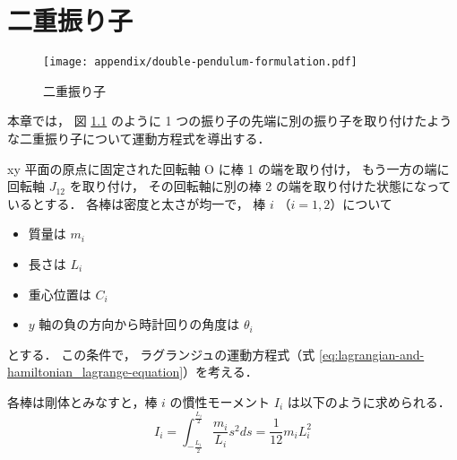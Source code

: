 %

\chapter{二重振り子}\label{chap:double-pendulum}

\begin{figure}[tp]
    \centering
    \texttt{[image: appendix/double-pendulum-formulation.pdf]}
    \caption{二重振り子}
    \label{fig:double-pendulum_double-pendulum-formulation}
\end{figure}

本章では，
図 \ref{fig:double-pendulum_double-pendulum-formulation} のように
1 つの振り子の先端に別の振り子を取り付けたような二重振り子について運動方程式を導出する．

xy 平面の原点に固定された回転軸 O に棒 1 の端を取り付け，
もう一方の端に回転軸 $J_{12}$ を取り付け，
その回転軸に別の棒 2 の端を取り付けた状態になっているとする．
各棒は密度と太さが均一で，
棒 $i$ （$i = 1, 2$）について
\begin{itemize}
    \item 質量は $m_i$
    \item 長さは $L_i$
    \item 重心位置は $C_i$
    \item $y$ 軸の負の方向から時計回りの角度は $\theta_i$
\end{itemize}
とする．
この条件で，
ラグランジュの運動方程式（式 \eqref{eq:lagrangian-and-hamiltonian_lagrange-equation}）を考える．

各棒は剛体とみなすと，棒 $i$ の慣性モーメント $I_i$ は以下のように求められる．
\begin{equation}
    I_i
    = \int_{-\frac{L_i}{2}}^{\frac{L_i}{2}} \frac{m_i}{L_i} s^2 ds
    = \frac{1}{12} m_i L_i^2
\end{equation}

